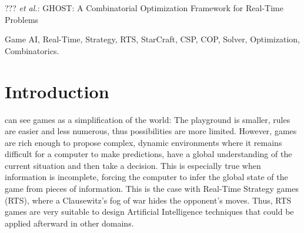 \documentclass[journal]{IEEEtran}
\newcommand{\ghost}{\textsc{GHOST}\xspace}
\begin{document}
%
{??? \MakeLowercase{\textit{et al.}}: \ghost: A Combinatorial Optimization Framework for Real-Time Problems}

\maketitle

\begin{abstract}
  This paper  presents \ghost, a combinatorial  optimization framework
  an RTS AI developer can use  to model and solve any problems encoded
  by a constraint satisfaction/optimization problem.  We show a way to
  model   three  very   different   RTS  problems   by  a   constraint
  satisfaction/optimization  problem,  each  problem  belonging  to  a
  specific level  of abstraction, and  test our solver on  them, using
  StarCraft  as  a  testbed.   For  the  three  problems  (the  target
  selection problem, the wall-ion problem and the build order planning
  problem), \ghost shows  very good results computed  within some tens
  of milliseconds.
\end{abstract}

\begin{IEEEkeywords}
Game AI, Real-Time, Strategy, RTS, StarCraft, CSP, COP, Solver,
Optimization, Combinatorics.
\end{IEEEkeywords}

%
\IEEEpeerreviewmaketitle

\section{Introduction}\label{sec:intro}

 can see games  as a simplification of the world:
The playground  is smaller, rules  are easier and less  numerous, thus
possibilities  are more  limited. However,  games are  rich enough  to
propose complex, dynamic environments where it remains difficult for a
computer  to make  predictions,  have a  global  understanding of  the
current situation  and then take  a decision. This is  especially true
when  information is  incomplete, forcing  the computer  to infer  the
global state of the game from  pieces of information. This is the case
with Real-Time Strategy  games (RTS), where a Clausewitz's  fog of war
hides  the opponent's  moves.  Thus,  RTS games  are very  suitable to
design  Artificial  Intelligence  techniques  that  could  be  applied
afterward in other domains.
\end{document}
